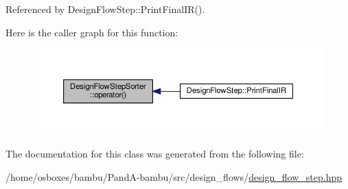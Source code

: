 Referenced by Design\+Flow\+Step\+::\+Print\+Final\+I\+R().

Here is the caller graph for this function\+:
\nopagebreak
\begin{figure}[H]
\begin{center}
\leavevmode
\includegraphics[width=350pt]{d2/d4a/classDesignFlowStepSorter_a11d143ee9b2281c1cad9ca12868e979f_icgraph}
\end{center}
\end{figure}


The documentation for this class was generated from the following file\+:\begin{DoxyCompactItemize}
\item 
/home/osboxes/bambu/\+Pand\+A-\/bambu/src/design\+\_\+flows/\hyperlink{design__flow__step_8hpp}{design\+\_\+flow\+\_\+step.\+hpp}\end{DoxyCompactItemize}

